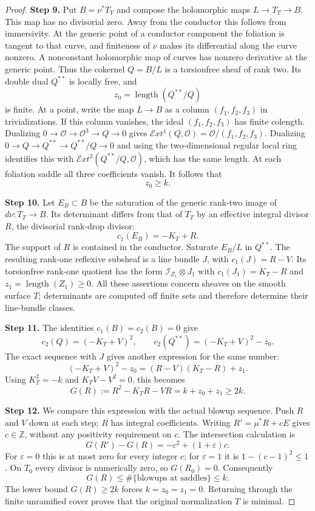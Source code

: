 \begin{proof}
\noindent\textbf{Step 9.} Put $B=\nu^*T_Y$ and compose the holomorphic
maps $L\to T_T\to B$. This map has no
divisorial zero. Away from the conductor this
follows from immersivity. At the generic point
of a conductor component the foliation is
tangent to that curve, and finiteness of
$\nu$ makes its differential along the curve
nonzero. A nonconstant holomorphic map of
curves has nonzero derivative at the generic
point. Thus the cokernel $Q=B/L$ is a
torsionfree sheaf of rank two. Its double
dual $Q^{**}$ is locally free, and
\[
 z_0=\operatorname{length}(Q^{**}/Q)
\]
is finite. At a point, write the map $L\to B$
as a column $(f_1,f_2,f_3)$ in trivializations.
If this column vanishes, the ideal
$(f_1,f_2,f_3)$ has finite colength. Dualizing
$0\to\mathcal O\to\mathcal O^3\to Q\to0$
gives $\mathcal E xt^1(Q,\mathcal O)
=\mathcal O/(f_1,f_2,f_3)$.
Dualizing $0\to Q\to Q^{**}\to Q^{**}/Q\to0$
and using the two-dimensional regular local
ring identifies this with
$\mathcal E xt^2(Q^{**}/Q,\mathcal O)$,
which has the same length. At each foliation
saddle all three coefficients vanish.
It follows that
\[
 z_0\ge k.
\]

\noindent\textbf{Step 10.} Let $E_B\subset B$ be the saturation of the
generic rank-two image of $d\nu:T_T\to B$.
Its determinant differs from that of $T_T$
by an effective integral divisor $R$, the
divisorial rank-drop divisor:
\[
 c_1(E_B)=-K_T+R.
\]
The support of $R$ is contained in the
conductor. Saturate $E_B/L$ in $Q^{**}$.
The resulting rank-one reflexive subsheaf
is a line bundle $J$, with
$c_1(J)=R-V$. Its torsionfree rank-one
quotient has the form
$\mathcal I_{Z_1}\otimes J_1$ with
$c_1(J_1)=K_T-R$ and
$z_1=\operatorname{length}(Z_1)\ge0$.
All these assertions concern sheaves on the
smooth surface $T$; determinants are computed
off finite sets and therefore determine their
line-bundle classes.

\noindent\textbf{Step 11.} The identities $c_1(B)=c_2(B)=0$ give
\[
 c_2(Q)=(-K_T+V)^2,\qquad
 c_2(Q^{**})=(-K_T+V)^2-z_0.
\]
The exact sequence with $J$ gives another
expression for the same number:
\[
 (-K_T+V)^2-z_0=(R-V)(K_T-R)+z_1.
\]
Using $K_T^2=-k$ and $K_TV-V^2=0$, this becomes
\[
 G(R):=R^2-K_TR-VR=k+z_0+z_1\ge2k.
\]

\noindent\textbf{Step 12.} We compare this expression with the actual
blowup sequence. Push $R$ and $V$ down at
each step; $R$ has integral coefficients.
Writing $R'=\mu^*R+cE$ gives $c\in\mathbb Z$,
without any positivity requirement on $c$.
The intersection calculation is
\[
 G(R')-G(R)=-c^2+(1+\varepsilon)c.
\]
For $\varepsilon=0$ this is at most zero
for every integer $c$; for $\varepsilon=1$
it is $1-(c-1)^2\le1$. On $T_0$ every
divisor is numerically zero, so $G(R_0)=0$.
Consequently
\[
 G(R)\le\#\{\text{blowups at saddles}\}\le k.
\]
The lower bound $G(R)\ge2k$ forces
$k=z_0=z_1=0$. Returning through the finite
unramified cover proves that the original
normalization $T$ is minimal.


\end{proof}
